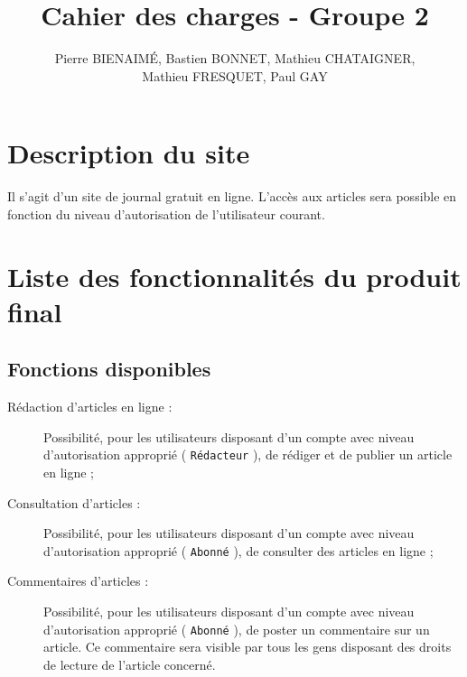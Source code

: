 \documentclass[a4paper,11pt]{article}
\title{Cahier des charges - Groupe 2}
\author{Pierre BIENAIMÉ, Bastien BONNET, Mathieu CHATAIGNER,\\ Mathieu FRESQUET, Paul GAY}
\begin{document}
\maketitle



\section{Description du site}
Il s'agit d'un site de journal gratuit en ligne. L'accès aux articles sera possible en fonction du niveau d'autorisation de l'utilisateur courant. 

\section{Liste des fonctionnalités du produit final}

\subsection{Fonctions disponibles}
    \begin{description}
	\item[Rédaction d'articles en ligne :] Possibilité, pour les utilisateurs disposant d'un com\-pte avec niveau d'autorisation approprié ( \texttt{Rédacteur} ), de rédiger et de publier un article en ligne ;
	\item[Consultation d'articles :] Possibilité, pour les utilisateurs disposant d'un compte avec niveau d'autorisation approprié ( \texttt{Abonné} ), de consulter des articles en ligne ;
	\item[Commentaires d'articles :] Possibilité, pour les utilisateurs disposant d'un compte avec niveau d'autorisation approprié ( \texttt{Abonné} ), de poster un commentaire sur un article. Ce commentaire sera visible par tous les gens disposant des droits de lecture de l'article concerné.
    \end{description}
\end{document}
